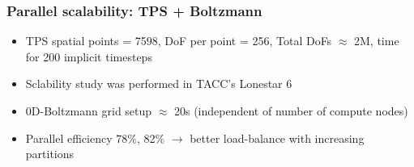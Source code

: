 \documentclass[mathserif, aspectratio=169]{beamer}
\newcommand{\vect}[1]{\boldsymbol{#1}}
\begin{document}
\begin{frame}[fragile]
	\frametitle{Parallel scalability: TPS + Boltzmann}
	\begin{itemize}
		\item TPS spatial points = 7598, DoF per point = 256, Total DoFs $\approx$ 2M, time for 200 implicit timesteps
		\item Sclability study was performed in TACC's Lonestar 6 %
	\end{itemize}
	\begin{figure}
		\centering
	\end{figure}
	\begin{itemize}
		\item 0D-Boltzmann grid setup $\approx$ 20s (independent of number of compute nodes)
		\item Parallel efficiency 78\%, 82\% $\rightarrow$ better load-balance with increasing partitions
	\end{itemize}
\end{frame}



\end{document}
